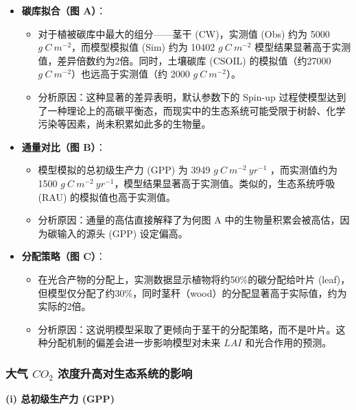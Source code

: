 \documentclass[10pt]{config}
\begin{document}
\begin{itemize}
    \item \textbf{碳库拟合（图 A）}：
    \begin{itemize}
    \item 对于植被碳库中最大的组分——茎干 (CW)，实测值 (Obs) 约为 5000 $g~C~m^{-2}$，而模型模拟值 (Sim) 约为 10402 $g~C~m^{-2}$ 模型结果显著高于实测值，差异倍数约为2倍。同时，土壤碳库 (CSOIL) 的模拟值（约27000 $g~C~m^{-2}$）也远高于实测值（约 2000 $g~C~m^{-2}$）。
    \item 分析原因：这种显著的差异表明，默认参数下的 Spin-up 过程使模型达到了一种理论上的高碳平衡态，而现实中的生态系统可能受限于树龄、化学污染等因素，尚未积累如此多的生物量。
    \end{itemize}

    \item \textbf{通量对比（图 B）}：
    \begin{itemize}
    \item 模型模拟的总初级生产力 (GPP) 为 3949 $g~C~m^{-2}~yr^{-1}$ ，而实测值约为 1500 $g~C~m^{-2}~yr^{-1}$，模型结果显著高于实测值。类似的，生态系统呼吸 (RAU) 的模拟值也高于实测值。
    \item 分析原因：通量的高估直接解释了为何图 A 中的生物量积累会被高估，因为碳输入的源头 (GPP) 设定偏高。
    \end{itemize}
    
    \item \textbf{分配策略（图 C）}：
    \begin{itemize}
    \item 在光合产物的分配上，实测数据显示植物将约50\%的碳分配给叶片 (leaf)，但模型仅分配了约30\%，同时茎秆（wood）的分配显著高于实际值，约为实际的2倍。
    \item 分析原因：这说明模型采取了更倾向于茎干的分配策略，而不是叶片。这种分配机制的偏差会进一步影响模型对未来 $LAI$ 和光合作用的预测。
    \end{itemize}
\end{itemize}

\subsubsection{大气 $CO_2$ 浓度升高对生态系统的影响}

\noindent
\textbf{(i) 总初级生产力 (GPP)}
\end{document}
